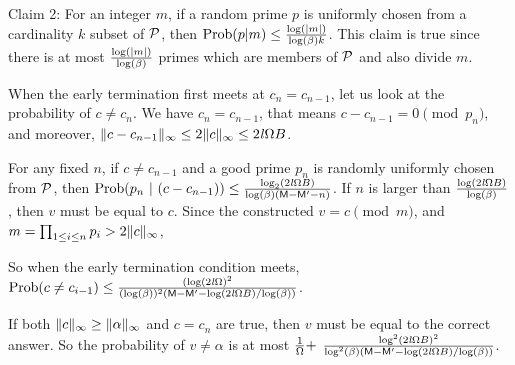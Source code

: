 Claim 2: For an integer $m$, if a random prime $p$ is uniformly chosen 
from a cardinality $k$ subset of $\mathcal P$, then
$\mbox{Prob}(p | m) \leq \frac{\log(|m|)}{\log(\beta)k}$.
This claim is true since there is at most $\frac{\log(|m|)}{\log(\beta)}$
primes which are members of $\mathcal P$ and also divide $m$.

When the early termination first meets at $c_{n} = c_{n-1}$,
let us look at the probability of $c \not= c_{n}$.
We have $c_n = c_{n-1}$, that means $c - c_{n-1} = 0 \pmod{p_n}$,
and moreover, $\|c - c_{n-1}\|_\infty \leq 2\|c\|_\infty
\leq 2 \mathit l \Omega B$.

For any fixed $n$, if $c \not= c_{n-1}$ and 
a good prime $p_n$ is randomly uniformly chosen from $\mathcal P$,
then $\mbox{Prob} (p_n~|~(c - c_{n-1}))
\leq \frac{\log_2(2\mathit l \Omega B)}{\log(\beta) 
(\mathsf M - \mathsf M^\prime - n)}$. 
If $n$ is larger than
$\frac{\log(2 \mathit l \Omega B)}{\log(\beta)}$, 
then $v$ must be equal to $c$.
Since the constructed $v = c \pmod m$, and 
$m = \prod_{1 \leq i \leq n}p_i > 2\|c\|_\infty$, 

So when the early termination condition meets,
$\mbox{Prob} (c \not= c_{i-1}) \leq 
\frac{(\log(2\mathit l \Omega)^2}{(\log(\beta))^2 
(\mathsf M - \mathsf M^\prime - {\log(2 \mathit l \Omega B)}/{\log(\beta)})}$.

If both $\|c\|_\infty \geq \|\alpha\|_\infty$ and $c = c_n$ are true, then
$v$ must be equal to the correct answer.
So the  probability of
$v \not= \alpha$ is
at most
$\frac{1}{\Omega}+$
$\frac{\log^2(2\mathit l \Omega B)^2}
{\log^2(\beta) 
(\mathsf M - \mathsf M^\prime - {\log(2 \mathit l \Omega B)}/{\log(\beta)})}$.
\QED
